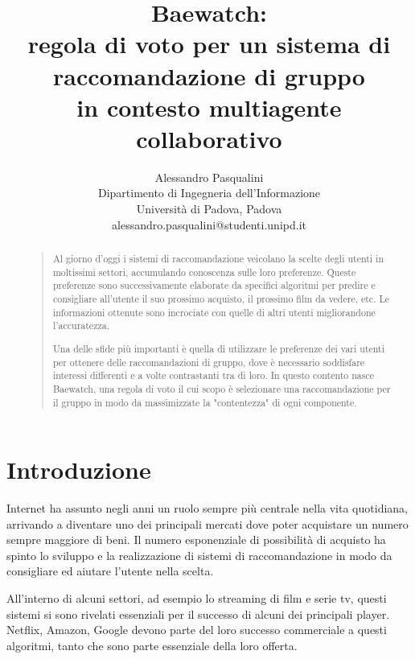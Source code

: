 \documentclass[letterpaper]{article}
\begin{document}
%
\title{Baewatch:\\regola di voto per un sistema di raccomandazione di gruppo\\in contesto multiagente collaborativo}
\author{Alessandro Pasqualini\\
Dipartimento di Ingegneria dell'Informazione\\
Università di Padova, Padova\\
alessandro.pasqualini@studenti.unipd.it\\
}
\maketitle
\begin{abstract}
\begin{quote}
Al giorno d'oggi i sistemi di raccomandazione veicolano la scelte degli utenti in moltissimi settori, accumulando conoscenza sulle loro preferenze. Queste preferenze sono successivamente elaborate da specifici algoritmi per predire e consigliare all'utente il suo prossimo acquisto, il prossimo film da vedere, etc. Le informazioni ottenute sono incrociate con quelle di altri utenti migliorandone l'accuratezza.

Una delle sfide più importanti è quella di utilizzare le preferenze dei vari utenti per ottenere delle raccomandazioni di gruppo, dove è necessario soddisfare interessi differenti e a volte contrastanti tra di loro. In questo contento nasce Baewatch, una regola di voto il cui scopo è selezionare una raccomandazione per il gruppo in modo da massimizzate la "contentezza" di ogni componente.

\end{quote}
\end{abstract}

\section{Introduzione}
Internet ha assunto negli anni un ruolo sempre più centrale nella vita quotidiana, arrivando a diventare uno dei principali mercati dove poter acquistare un numero sempre maggiore di beni. Il numero esponenziale di possibilità di acquisto ha spinto lo sviluppo e la realizzazione di sistemi di raccomandazione in modo da consigliare ed aiutare l'utente nella scelta.

All'interno di alcuni settori, ad esempio lo streaming di film e serie tv, questi sistemi si sono rivelati essenziali per il successo di alcuni dei principali player. Netflix, Amazon, Google devono parte del loro successo commerciale a questi algoritmi, tanto che sono parte essenziale della loro offerta.
\end{document}

